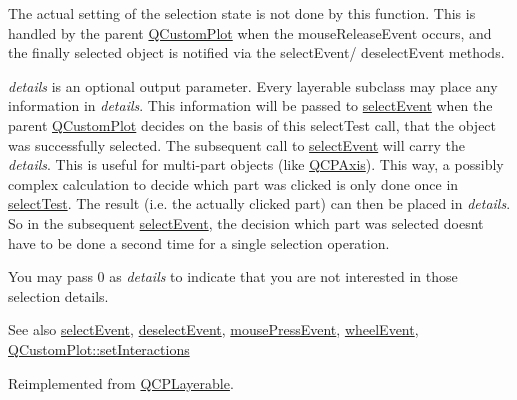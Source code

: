 The actual setting of the selection state is not done by this function. This is handled by the parent \mbox{\hyperlink{class_q_custom_plot}{Q\+Custom\+Plot}} when the mouse\+Release\+Event occurs, and the finally selected object is notified via the select\+Event/ deselect\+Event methods.

{\itshape details} is an optional output parameter. Every layerable subclass may place any information in {\itshape details}. This information will be passed to \mbox{\hyperlink{class_q_c_p_abstract_plottable_a2d488568cf16600dd81fa23d7d439829}{select\+Event}} when the parent \mbox{\hyperlink{class_q_custom_plot}{Q\+Custom\+Plot}} decides on the basis of this select\+Test call, that the object was successfully selected. The subsequent call to \mbox{\hyperlink{class_q_c_p_abstract_plottable_a2d488568cf16600dd81fa23d7d439829}{select\+Event}} will carry the {\itshape details}. This is useful for multi-\/part objects (like \mbox{\hyperlink{class_q_c_p_axis}{Q\+C\+P\+Axis}}). This way, a possibly complex calculation to decide which part was clicked is only done once in \mbox{\hyperlink{class_q_c_p_abstract_plottable_addb3f5c41f007a78c3e142cc605bc712}{select\+Test}}. The result (i.\+e. the actually clicked part) can then be placed in {\itshape details}. So in the subsequent \mbox{\hyperlink{class_q_c_p_abstract_plottable_a2d488568cf16600dd81fa23d7d439829}{select\+Event}}, the decision which part was selected doesn\textquotesingle{}t have to be done a second time for a single selection operation.

You may pass 0 as {\itshape details} to indicate that you are not interested in those selection details.

\begin{DoxySeeAlso}{See also}
\mbox{\hyperlink{class_q_c_p_abstract_plottable_a2d488568cf16600dd81fa23d7d439829}{select\+Event}}, \mbox{\hyperlink{class_q_c_p_abstract_plottable_a9b104d9da4f38f934363945c313bf82e}{deselect\+Event}}, \mbox{\hyperlink{class_q_c_p_layerable_af6567604818db90f4fd52822f8bc8376}{mouse\+Press\+Event}}, \mbox{\hyperlink{class_q_c_p_layerable_a47dfd7b8fd99c08ca54e09c362b6f022}{wheel\+Event}}, \mbox{\hyperlink{class_q_custom_plot_a5ee1e2f6ae27419deca53e75907c27e5}{Q\+Custom\+Plot\+::set\+Interactions}} 
\end{DoxySeeAlso}


Reimplemented from \mbox{\hyperlink{class_q_c_p_layerable_a04db8351fefd44cfdb77958e75c6288e}{Q\+C\+P\+Layerable}}.



